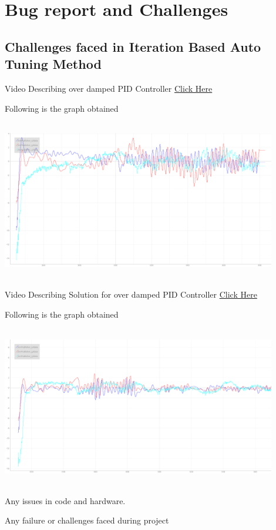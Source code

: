\documentclass[a4paper,12pt,oneside]{book}
\begin{document}
\pagebreak
\section{Bug report and Challenges}

\subsection{Challenges faced in Iteration Based Auto Tuning Method}
\hspace{0.5cm}Video Describing over damped PID Controller
\href{https://youtu.be/r5Gr7pc5F2s}{Click Here}


Following is the graph obtained

\includegraphics[width = 12cm , height= 7cm]{Overdamped.png}


Video Describing Solution for over damped PID Controller
\href{https://youtu.be/FB5wPt4SCgo}{Click Here}

Following is the graph obtained


\includegraphics[width = 12cm , height= 7cm]{Overdamped_Solved.png}


Any issues in code and hardware.

Any failure or challenges faced during project
\end{document}
